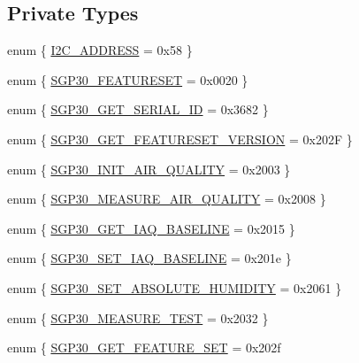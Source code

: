 \subsection*{Private Types}
\begin{DoxyCompactItemize}
\item 
enum \{ \hyperlink{classSGP30_a5b752e81e00059c22c039ab0fa2021d0a509dbee04dff24f01fb2c7892703a3bd}{I2\+C\+\_\+\+A\+D\+D\+R\+E\+SS} = 0x58
 \}
\item 
enum \{ \hyperlink{classSGP30_a2729a6a324c09b992fbfc46fc4bfed66ae33bc9477a75eb531e3868a02ef79c78}{S\+G\+P30\+\_\+\+F\+E\+A\+T\+U\+R\+E\+S\+ET} = 0x0020
 \}
\item 
enum \{ \hyperlink{classSGP30_aacd1f082dc76bc6251edf06f0b3832c0ace04a9903c43bc54b35a579e0c661e13}{S\+G\+P30\+\_\+\+G\+E\+T\+\_\+\+S\+E\+R\+I\+A\+L\+\_\+\+ID} = 0x3682
 \}
\item 
enum \{ \hyperlink{classSGP30_aca7fa4ab06bdae25a5fb142ec20f58d3a9d732bc016196d5decb7e1dd2b1e2dd7}{S\+G\+P30\+\_\+\+G\+E\+T\+\_\+\+F\+E\+A\+T\+U\+R\+E\+S\+E\+T\+\_\+\+V\+E\+R\+S\+I\+ON} = 0x202F
 \}
\item 
enum \{ \hyperlink{classSGP30_a9fab3e307da43db87a836b096151a31ca68ef1f21f1267a8b1109796eea0e19fe}{S\+G\+P30\+\_\+\+I\+N\+I\+T\+\_\+\+A\+I\+R\+\_\+\+Q\+U\+A\+L\+I\+TY} = 0x2003
 \}
\item 
enum \{ \hyperlink{classSGP30_a7dc6849851676f2dbd1e118ff782d830a1d8427617ada8d841010c43f382bccfa}{S\+G\+P30\+\_\+\+M\+E\+A\+S\+U\+R\+E\+\_\+\+A\+I\+R\+\_\+\+Q\+U\+A\+L\+I\+TY} = 0x2008
 \}
\item 
enum \{ \hyperlink{classSGP30_a6265830ddaa1c5e55a1efe326326e57ea5df373d3deebce36ee7a1c745c9c735a}{S\+G\+P30\+\_\+\+G\+E\+T\+\_\+\+I\+A\+Q\+\_\+\+B\+A\+S\+E\+L\+I\+NE} = 0x2015
 \}
\item 
enum \{ \hyperlink{classSGP30_adb75f486c71b86401a9e61cf6d37449ba21711e444f927177674d89c44702904a}{S\+G\+P30\+\_\+\+S\+E\+T\+\_\+\+I\+A\+Q\+\_\+\+B\+A\+S\+E\+L\+I\+NE} = 0x201e
 \}
\item 
enum \{ \hyperlink{classSGP30_a4f249632f5e33f139cd7377c728cba1da8ad78d173fbf29a175db80bf59d8a361}{S\+G\+P30\+\_\+\+S\+E\+T\+\_\+\+A\+B\+S\+O\+L\+U\+T\+E\+\_\+\+H\+U\+M\+I\+D\+I\+TY} = 0x2061
 \}
\item 
enum \{ \hyperlink{classSGP30_af209e8391e943c53e3c6aa3479e4a8f9adaacf9a8f14c2f6903cdb635b3e8a1fd}{S\+G\+P30\+\_\+\+M\+E\+A\+S\+U\+R\+E\+\_\+\+T\+E\+ST} = 0x2032
 \}
\item 
enum \{ \hyperlink{classSGP30_a1d3a484196d7d31bf7d4210b410bb760a375ad7f464e6a21241bd655100a5ce94}{S\+G\+P30\+\_\+\+G\+E\+T\+\_\+\+F\+E\+A\+T\+U\+R\+E\+\_\+\+S\+ET} = 0x202f

\end{DoxyCompactItemize}

